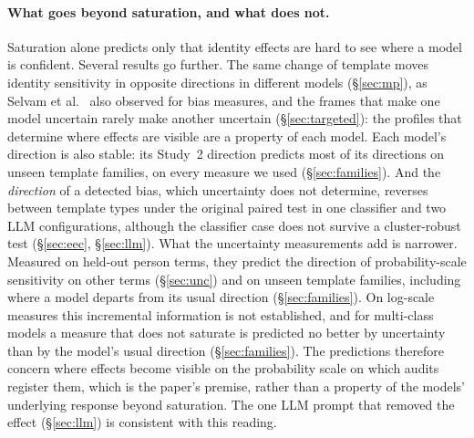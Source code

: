 \documentclass[runningheads]{llncs}
\begin{document}
\paragraph{What goes beyond saturation, and what does not.} Saturation alone
predicts only that identity effects are hard to see where a model is
confident. Several results go further. The same change of template moves
identity sensitivity in opposite directions in different models
(\S\ref{sec:mp}), as Selvam et al.~\cite{selvam2023} also observed for bias
measures, and the frames that make one model uncertain rarely make another
uncertain (\S\ref{sec:targeted}): the profiles that determine where effects are
visible are a property of each model. Each model's direction is also stable:
its Study~2 direction predicts most of its directions on unseen template
families, on every measure we used (\S\ref{sec:families}). And the
\emph{direction} of a detected bias, which uncertainty does not determine,
reverses between template types under the original paired test in one
classifier and two LLM configurations, although the classifier case does not
survive a cluster-robust test (\S\ref{sec:eec}, \S\ref{sec:llm}). What the
uncertainty measurements add is narrower. Measured on held-out person terms,
they predict the direction of probability-scale sensitivity on other terms
(\S\ref{sec:unc}) and on unseen template families, including where a model
departs from its usual direction (\S\ref{sec:families}). On log-scale measures
this incremental information is not established, and for multi-class models a
measure that does not saturate is predicted no better by uncertainty than by
the model's usual direction (\S\ref{sec:families}). The predictions therefore
concern where effects become visible on the probability scale on which audits
register them, which is the paper's premise, rather than a property of the
models' underlying response beyond saturation. The one LLM prompt that removed
the effect (\S\ref{sec:llm}) is consistent with this reading.
\end{document}

